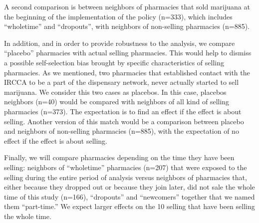 \documentclass[11pt]{article}
\begin{document}
A second comparison is between neighbors of pharmacies that sold marijuana at the beginning of the implementation of the policy (n=333), which includes ``wholetime'' and ``dropouts'', with neighbors of non-selling pharmacies (n=885).

In addition, and in order to provide robustness to the analysis, we compare ``placebo'' pharmacies with actual selling pharmacies. This would help to dismiss a possible self-selection bias brought by specific characteristics of selling pharmacies. As we mentioned, two pharmacies that established contact with the IRCCA to be a part of the dispensary network, never actually started to sell marijuana. We consider this two cases as placebos. In this case, placebos neighbors (n=40) would be compared with neighbors of all kind of selling pharmacies (n=373). The expectation is to find an effect if the effect is about selling. Another version of this match would be a comparison between placebo and neighbors of non-selling pharmacies (n=885), with the expectation of no effect if the effect is about selling.

Finally, we will compare pharmacies depending on the time they have been selling: neighbors of ``wholetime'' pharmacies (n=207) that were exposed to the selling during the entire period of analysis versus neighbors of pharmacies that, either because they dropped out or because they join later, did not sale the whole time of this study (n=166), ``dropouts'' and ``newcomers'' together that we named them ``part-time.'' We expect larger effects on the 10 selling that have been selling the whole time.
\end{document}
